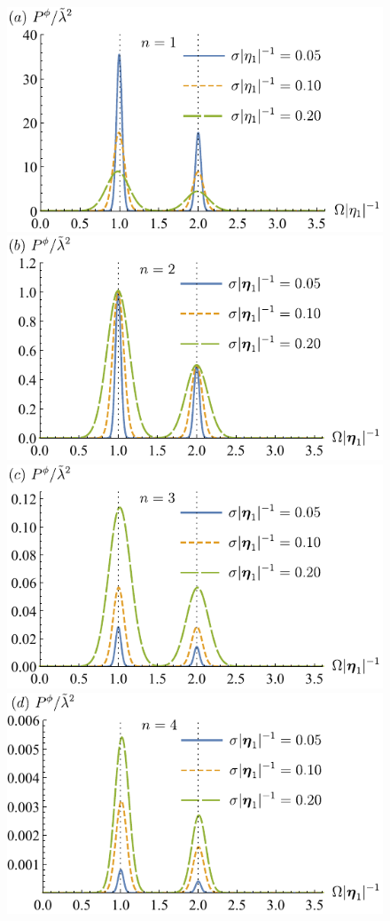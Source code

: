 \documentclass[prd,twocolumn,superscriptaddress,nofootinbib,floatfix,amsmath,amssymb]{revtex4-2}
\begin{document}
    \begin{figure}[tp]
        \centering
        \includegraphics[scale=0.825]{Fig4a.pdf}
        \includegraphics[scale=0.825]{Fig4b.pdf}
        \includegraphics[scale=0.825]{Fig4c.pdf}
        \includegraphics[scale=0.825]{Fig4d.pdf}

\end{figure}
\end{document}
